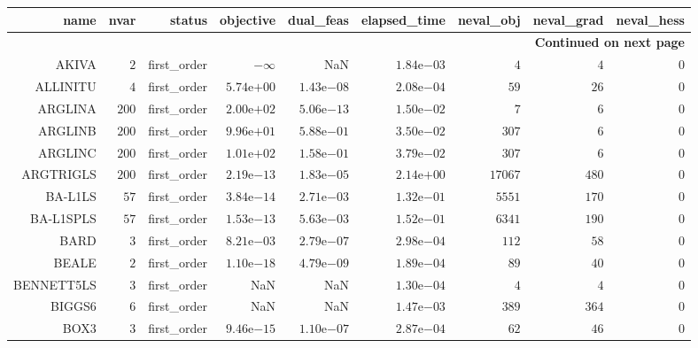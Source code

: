 \begin{longtable}{rrrrrrrrr}
\hline
name & nvar & status & objective & dual\_feas & elapsed\_time & neval\_obj & neval\_grad & neval\_hess \\\hline
\endhead
\hline
\multicolumn{9}{r}{{\bfseries Continued on next page}}\\
\hline
\endfoot
\endlastfoot
AKIVA & \(     2\) & first\_order & \(-\infty\) &       NaN & \( 1.84\)e\(-03\) & \(     4\) & \(     4\) & \(     0\) \\
ALLINITU & \(     4\) & first\_order & \( 5.74\)e\(+00\) & \( 1.43\)e\(-08\) & \( 2.08\)e\(-04\) & \(    59\) & \(    26\) & \(     0\) \\
ARGLINA & \(   200\) & first\_order & \( 2.00\)e\(+02\) & \( 5.06\)e\(-13\) & \( 1.50\)e\(-02\) & \(     7\) & \(     6\) & \(     0\) \\
ARGLINB & \(   200\) & first\_order & \( 9.96\)e\(+01\) & \( 5.88\)e\(-01\) & \( 3.50\)e\(-02\) & \(   307\) & \(     6\) & \(     0\) \\
ARGLINC & \(   200\) & first\_order & \( 1.01\)e\(+02\) & \( 1.58\)e\(-01\) & \( 3.79\)e\(-02\) & \(   307\) & \(     6\) & \(     0\) \\
ARGTRIGLS & \(   200\) & first\_order & \( 2.19\)e\(-13\) & \( 1.83\)e\(-05\) & \( 2.14\)e\(+00\) & \( 17067\) & \(   480\) & \(     0\) \\
BA-L1LS & \(    57\) & first\_order & \( 3.84\)e\(-14\) & \( 2.71\)e\(-03\) & \( 1.32\)e\(-01\) & \(  5551\) & \(   170\) & \(     0\) \\
BA-L1SPLS & \(    57\) & first\_order & \( 1.53\)e\(-13\) & \( 5.63\)e\(-03\) & \( 1.52\)e\(-01\) & \(  6341\) & \(   190\) & \(     0\) \\
BARD & \(     3\) & first\_order & \( 8.21\)e\(-03\) & \( 2.79\)e\(-07\) & \( 2.98\)e\(-04\) & \(   112\) & \(    58\) & \(     0\) \\
BEALE & \(     2\) & first\_order & \( 1.10\)e\(-18\) & \( 4.79\)e\(-09\) & \( 1.89\)e\(-04\) & \(    89\) & \(    40\) & \(     0\) \\
BENNETT5LS & \(     3\) & first\_order &       NaN &       NaN & \( 1.30\)e\(-04\) & \(     4\) & \(     4\) & \(     0\) \\
BIGGS6 & \(     6\) & first\_order &       NaN &       NaN & \( 1.47\)e\(-03\) & \(   389\) & \(   364\) & \(     0\) \\
BOX3 & \(     3\) & first\_order & \( 9.46\)e\(-15\) & \( 1.10\)e\(-07\) & \( 2.87\)e\(-04\) & \(    62\) & \(    46\) & \(     0\) \\

\end{longtable}
